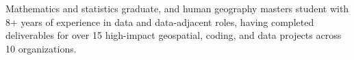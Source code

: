 
Mathematics and statistics graduate, and human geography masters student with 8+ years of experience in data and data-adjacent roles, having completed deliverables for over 15 high-impact geospatial, coding, and data projects across 10 organizations.
